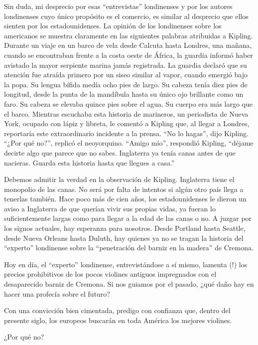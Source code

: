 \documentclass[12pt]{book}
\begin{document}
Sin duda, mi desprecio por esas ``entrevistas'' londinenses y por los autores londinenses cuyo único propósito es el comercio, es similar al desprecio que ellos sienten por los estadounidenses. La opinión de los londinenses sobre los americanos se muestra claramente en las siguientes palabras atribuidas a Kipling.  
Durante un viaje en un barco de vela desde Calcuta hasta Londres, una mañana, cuando se encontraban frente a la costa oeste de África, la guardia informó haber avistado la mayor serpiente marina jamás registrada. La guardia declaró que su atención fue atraída primero por un siseo similar al vapor, cuando emergió bajo la popa. Su lengua bífida medía ocho pies de largo. Su cabeza tenía diez pies de longitud, desde la punta de la mandíbula hasta su único ojo brillante como un faro. Su cabeza se elevaba quince pies sobre el agua. Su cuerpo era más largo que el barco.  
Mientras escuchaba esta historia de marineros, un periodista de Nueva York, ocupado con lápiz y libreta, le comentó a Kipling que, al llegar a Londres, reportaría este extraordinario incidente a la prensa.  
``No lo hagas'', dijo Kipling.  
``¿Por qué no?'', replicó el neoyorquino.  
``Amigo mío'', respondió Kipling, ``déjame decirte algo que parece que no sabes. Inglaterra ya tenía canas antes de que nacieras. Guarda esta historia hasta que llegues a casa.''  

Debemos admitir la verdad en la observación de Kipling. Inglaterra tiene el monopolio de las canas. No será por falta de intentos si algún otro país llega a tenerlas también. Hace poco más de cien años, los estadounidenses le dieron un aviso a Inglaterra de que querían vivir sus propias vidas, ya fueran lo suficientemente largas como para llegar a la edad de las canas o no. A juzgar por los signos actuales, hay esperanza para nosotros. Desde Portland hasta Seattle, desde Nueva Orleans hasta Duluth, hay quienes ya no se tragan la historia del ``experto'' londinense sobre la ``penetración del barniz en la madera'' de Cremona.  

Hoy en día, el ``experto'' londinense, entrevistándose a sí mismo, lamenta (!) los precios prohibitivos de los pocos violines antiguos impregnados con el desaparecido barniz de Cremona.  
Si nos guiamos por el pasado, ¿qué daño hay en hacer una profecía sobre el futuro?  

Con una convicción bien cimentada, predigo con confianza que, dentro del presente siglo, los europeos buscarán en toda América los mejores violines.  

¿Por qué no?  
\end{document}
